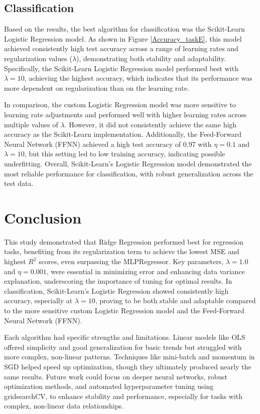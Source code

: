 \documentclass{article}
\newcommand{\0}{\mathbf{0}}
\newcommand{\1}{\mathbf{1}}
\begin{document}
\subsection{Classification}

Based on the results, the best algorithm for classification was the Scikit-Learn Logistic Regression model. As shown in Figure \ref{Accuracy_taskE}, this model achieved consistently high test accuracy across a range of learning rates and regularization values (\(\lambda\)), demonstrating both stability and adaptability. Specifically, the Scikit-Learn Logistic Regression model performed best with \(\lambda = 10\), achieving the highest accuracy, which indicates that its performance was more dependent on regularization than on the learning rate.

In comparison, the custom Logistic Regression model was more sensitive to learning rate adjustments and performed well with higher learning rates across multiple values of \(\lambda\). However, it did not consistently achieve the same high accuracy as the Scikit-Learn implementation. Additionally, the Feed-Forward Neural Network (FFNN) achieved a high test accuracy of 0.97 with \(\eta = 0.1\) and \(\lambda = 10\), but this setting led to low training accuracy, indicating possible underfitting. Overall, Scikit-Learn's Logistic Regression model demonstrated the most reliable performance for classification, with robust generalization across the test data.




\section{Conclusion}

This study demonstrated that Ridge Regression performed best for regression tasks, benefiting from its regularization term to achieve the lowest MSE and highest \( R^2 \) scores, even surpassing the MLPRegressor. Key parameters, \(\lambda = 1.0\) and \(\eta = 0.001\), were essential in minimizing error and enhancing data variance explanation, underscoring the importance of tuning for optimal results. In classification, Scikit-Learn's Logistic Regression showed consistently high accuracy, especially at \(\lambda = 10\), proving to be both stable and adaptable compared to the more sensitive custom Logistic Regression model and the Feed-Forward Neural Network (FFNN).

Each algorithm had specific strengths and limitations. Linear models like OLS offered simplicity and good generalization for basic trends but struggled with more complex, non-linear patterns. Techniques like mini-batch and momentum in SGD helped speed up optimization, though they ultimately produced nearly the same results. Future work could focus on deeper neural networks, robust optimization methods, and automated hyperparameter tuning using gridsearchCV, to enhance stability and performance, especially for tasks with complex, non-linear data relationships.
\end{document}
